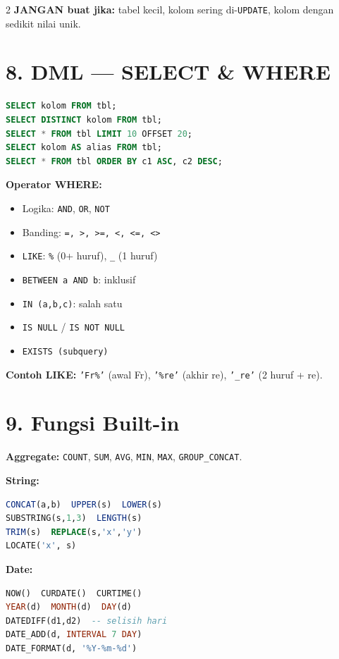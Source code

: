 \documentclass[10pt,a4paper]{article}
\begin{document}
\begin{multicols*}{2}
	\textbf{JANGAN buat jika:} tabel kecil, kolom sering di-\texttt{UPDATE}, kolom dengan sedikit nilai unik.

	\section*{8. DML — SELECT \& WHERE}

	\begin{lstlisting}[language=SQL]
SELECT kolom FROM tbl;
SELECT DISTINCT kolom FROM tbl;
SELECT * FROM tbl LIMIT 10 OFFSET 20;
SELECT kolom AS alias FROM tbl;
SELECT * FROM tbl ORDER BY c1 ASC, c2 DESC;
\end{lstlisting}

	\textbf{Operator WHERE:}
	\begin{itemize}
		\item Logika: \texttt{AND}, \texttt{OR}, \texttt{NOT}
		\item Banding: \texttt{=, >, >=, <, <=, <>}
		\item \texttt{LIKE}: \texttt{\%} (0+ huruf), \texttt{\_} (1 huruf)
		\item \texttt{BETWEEN a AND b}: inklusif
		\item \texttt{IN (a,b,c)}: salah satu
		\item \texttt{IS NULL} / \texttt{IS NOT NULL}
		\item \texttt{EXISTS (subquery)}
	\end{itemize}

	\textbf{Contoh LIKE:} \texttt{'Fr\%'} (awal Fr), \texttt{'\%re'} (akhir re), \texttt{'\_re'} (2 huruf + re).

	\section*{9. Fungsi Built-in}

	\textbf{Aggregate:} \texttt{COUNT}, \texttt{SUM}, \texttt{AVG}, \texttt{MIN}, \texttt{MAX}, \texttt{GROUP\_CONCAT}.

	\textbf{String:}
	\begin{lstlisting}[language=SQL]
CONCAT(a,b)  UPPER(s)  LOWER(s)
SUBSTRING(s,1,3)  LENGTH(s)
TRIM(s)  REPLACE(s,'x','y')
LOCATE('x', s)
\end{lstlisting}

	\textbf{Date:}
	\begin{lstlisting}[language=SQL]
NOW()  CURDATE()  CURTIME()
YEAR(d)  MONTH(d)  DAY(d)
DATEDIFF(d1,d2)  -- selisih hari
DATE_ADD(d, INTERVAL 7 DAY)
DATE_FORMAT(d, '%Y-%m-%d')
\end{lstlisting}


\end{multicols*}
\end{document}

